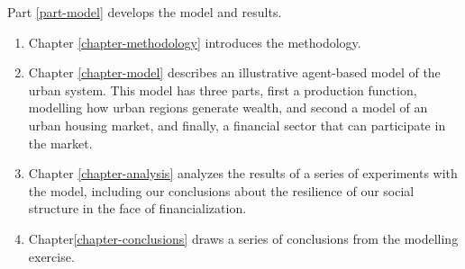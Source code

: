 Part \ref{part-model} develops the model and results.
\begin{enumerate}
    \item Chapter \ref{chapter-methodology} introduces the methodology. %
    \item Chapter \ref{chapter-model} describes an illustrative agent-based model of the urban system. 
    This model has three  parts, first a production function, modelling how urban regions generate wealth, and second a model of an urban housing market, and finally, a financial sector that can participate in the market. 
    \item Chapter \ref{chapter-analysis} analyzes the results of a series of experiments with the model, including our conclusions about the resilience of our social structure in the face of financialization.
    \item Chapter\ref{chapter-conclusions} draws a series of conclusions from the modelling exercise.
\end{enumerate}


